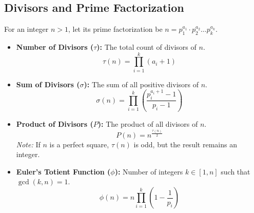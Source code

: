 \subsection{Divisors and Prime Factorization}

For an integer $n > 1$, let its prime factorization be $n = p_1^{a_1} \cdot p_2^{a_2} \dots p_k^{a_k}$.

\begin{itemize}
    \item \textbf{Number of Divisors ($\tau$):} 
    The total count of divisors of $n$.
    \[ \tau(n) = \prod_{i=1}^{k} (a_i + 1) \]

    \item \textbf{Sum of Divisors ($\sigma$):} 
    The sum of all positive divisors of $n$.
    \[ \sigma(n) = \prod_{i=1}^{k} \left( \frac{p_i^{a_i+1} - 1}{p_i - 1} \right) \]

    \item \textbf{Product of Divisors ($P$):} 
    The product of all divisors of $n$.
    \[ P(n) = n^{\frac{\tau(n)}{2}} \]
    \textit{Note:} If $n$ is a perfect square, $\tau(n)$ is odd, but the result remains an integer.

    \item \textbf{Euler's Totient Function ($\phi$):} 
    Number of integers $k \in [1, n]$ such that $\gcd(k, n) = 1$.
    \[ \phi(n) = n \prod_{i=1}^{k} \left( 1 - \frac{1}{p_i} \right) \]
\end{itemize}